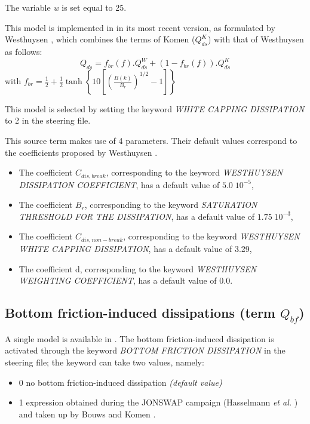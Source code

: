  The variable \textit{w} is set equal to 25.

 This model is implemented in \tomawac in its most recent version, as
 formulated by Westhuysen \cite{Westhuys2008}, which combines the terms of
 Komen \cite{Komen1984} ($Q_{ds}^{K}$) with that of Westhuysen
 \cite{Westhuys2007} as follows:
\begin{equation} \label{GrindEQ__4_41_}
Q_{ds} =f_{br} (f).Q_{ds} ^{W} +\left(1-f_{br} (f)\right).Q_{ds} ^K
\end{equation}
with $f_{br} =\frac{1}{2} +\frac{1}{2} \tanh \left\{10\left[
  \left(\frac{B(k)}{B_{r} } \right)^{1/2} -1\right]\right\}$

This model is selected by setting the keyword \textit{WHITE CAPPING
  DISSIPATION} to 2 in the steering file.\textbf{}

This source term makes use of 4 parameters. Their default values correspond
to the coefficients proposed by Westhuysen  \cite{Westhuys2008}.

\begin{itemize}
\item  The coefficient ${C}_{dis,break}$, corresponding to the keyword
  \textit{WESTHUYSEN  DISSIPATION COEFFICIENT}, has a default value of
  $5.0\; 10^{-5}$,
\item  The coefficient ${B}_{r}$, corresponding to the keyword
  \textit{SATURATION THRESHOLD FOR THE DISSIPATION}, has a default value of
  $1.75\; 10^{-3}$,
\item  The coefficient ${C}_{dis,non-break}$, corresponding to the keyword
  \textit{WESTHUYSEN WHITE CAP\-PING DISSIPATION}, has a default value of 3.29,
\item  The coefficient d, corresponding to the keyword \textit{WESTHUYSEN
  WEIGHTING COEFFICIENT}, has a default value of 0.0.
\end{itemize}


\subsection{ Bottom friction-induced dissipations (term $Q_{bf}$)}
\label{BOTTOMFRICTION}
A single model is available in \tomawac. The bottom friction-induced
dissipation is activated through the keyword \textit{BOTTOM FRICTION
  DISSIPATION} in the steering file; the keyword can take two values, namely:

 \begin{itemize}
\item 0 no bottom friction-induced dissipation \textit{(default value)}

\item 1 expression obtained during the JONSWAP campaign (Hasselmann
  \textit{et al.} \cite{Hasselmann1973}) and taken up by Bouws and Komen
  \cite{Bouws1983}.
\end{itemize}

